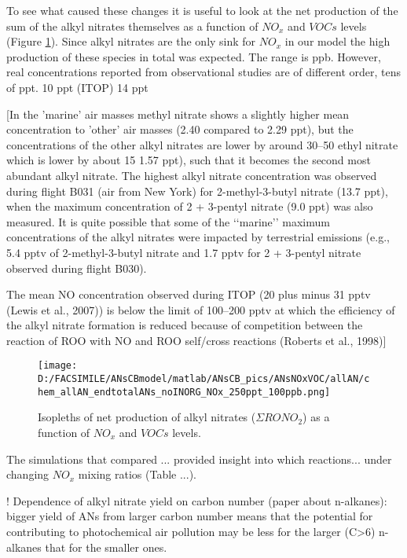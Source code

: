 \documentclass[11pt,a4paper]{article}
\begin{document}
To see what caused these changes it is useful to look at the net production of the sum of the alkyl nitrates themselves as a function of $NO_x$ and $VOCs$ levels (Figure \ref{fig:endtotalANs}). Since alkyl nitrates are the only sink for $NO_x$ in our model the high production of these species in total was expected. The range is ppb.
However, real concentrations reported from observational studies are of different order, tens of ppt.
\citep{Reeves2007} 10 ppt (ITOP) \citep{Roberts1998} 14 ppt

\citep{Reeves2007}
[In the 'marine' air masses methyl nitrate shows a slightly higher mean concentration to 'other' air masses (2.40 compared to 2.29 ppt), but the concentrations of the other alkyl
nitrates are lower by around 30–50%
ethyl nitrate which is lower by about 15%
1.57 ppt), such that it becomes the second most abundant alkyl
nitrate.
The highest alkyl
nitrate concentration was observed during flight B031 (air
from New York) for 2-methyl-3-butyl nitrate (13.7 ppt),
when the maximum concentration of 2 + 3-pentyl nitrate
(9.0 ppt) was also measured. It is quite possible that some of
the ‘‘marine’’ maximum concentrations of the alkyl nitrates
were impacted by terrestrial emissions (e.g., 5.4 pptv of
2-methyl-3-butyl nitrate and 1.7 pptv for 2 + 3-pentyl nitrate
observed during flight B030).

The mean NO concentration observed during ITOP (20 plus minus 31 pptv (Lewis et al., 2007)) is below the limit of 100–200 pptv at which the efficiency of the alkyl nitrate formation is reduced because of competition between the reaction of ROO with NO and ROO self/cross reactions (Roberts et al., 1998)]

\begin{figure} %
\texttt{[image: D:/FACSIMILE/ANsCBmodel/matlab/ANsCB\_pics/ANsNOxVOC/allAN/chem\_allAN\_endtotalANs\_noINORG\_NOx\_250ppt\_100ppb.png]}
\caption{Isopleths of net production of alkyl nitrates ($\Sigma RONO_2$) as a function of $NO_x$ and $VOCs$ levels.}\label{fig:endtotalANs}
\end{figure}


The simulations that compared ... provided insight into which reactions... under changing $NO_x$ mixing ratios (Table ...).

! Dependence of alkyl nitrate yield on carbon number (paper about n-alkanes): bigger yield of ANs from larger carbon number means that the potential for contributing to photochemical air pollution may be less for the larger (C>6) n-alkanes that for the smaller ones.
\end{document}
